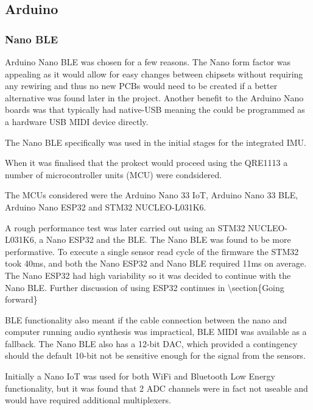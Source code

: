 \subsection{Arduino}\label{arduino}

\subsubsection{Nano BLE}\label{nano-ble}

Arduino Nano BLE was chosen for a few reasons. The Nano form factor was
appealing as it would allow for easy changes between chipsets without
requiring any rewiring and thus no new PCBs would need to be created if
a better alternative was found later in the project. Another benefit to
the Arduino Nano boards was that typically had native-USB meaning the
could be programmed as a hardware USB MIDI device directly.

The Nano BLE specifically was used in the initial stages for the
integrated IMU.

When it was finalised that the prokect would proceed using the QRE1113 a
number of microcontroller units (MCU) were condsidered.

The MCUs considered were the Arduino Nano 33 IoT, Arduino Nano 33 BLE,
Arduino Nano ESP32 and STM32 NUCLEO-L031K6.

A rough performance test was later carried out using an STM32
NUCLEO-L031K6, a Nano ESP32 and the BLE. The Nano BLE was found to be
more performative. To execute a single sensor read cycle of the firmware
the STM32 took 40ms, and both the Nano ESP32 and Nano BLE required 11ms
on average. The Nano ESP32 had high variability so it was decided to
continue with the Nano BLE. Further discussion of using ESP32 continues
in \textbackslash section\{Going forward\}

BLE functionality also meant if the cable connection between the nano
and computer running audio synthesis was impractical, BLE MIDI was
available as a fallback. The Nano BLE also has a 12-bit DAC, which
provided a contingency should the default 10-bit not be sensitive enough
for the signal from the sensors.

Initially a Nano IoT was used for both WiFi and Bluetooth Low Energy
functionality, but it was found that 2 ADC channels were in fact not
useable and would have required additional multiplexers.

